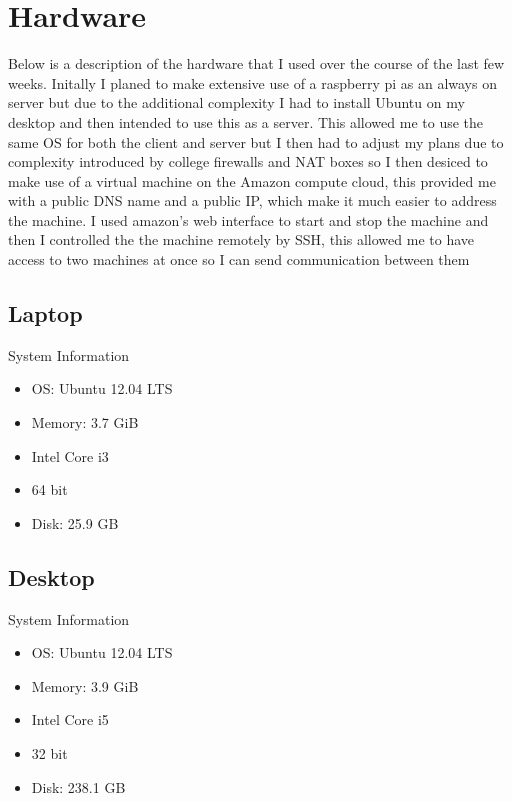 \documentclass[12pt,a4paper,oneside]{article}
\begin{document}
\section{Hardware} 
Below is a description of the hardware that I used over the course of the last few weeks. Initally I planed to make extensive use of a raspberry pi as an always on server but due to the additional complexity I had to install Ubuntu on my desktop and then intended to use this as a server. This allowed me to use the same OS for both the client and server but I then had to adjust my plans due to complexity introduced by college firewalls and NAT boxes so I then desiced to make use of a virtual machine on the Amazon compute cloud, this provided me with a public DNS name and a public IP, which make it much easier to address the machine. I used amazon's web interface to start and stop the machine and then I controlled the the machine remotely by SSH, this allowed me to have access to two machines at once so I can send communication between them

\subsection{Laptop}
System Information
\begin{itemize}
\item OS: Ubuntu 12.04 LTS
\item Memory: 3.7 GiB
\item Intel Core i3
\item 64 bit
\item Disk: 25.9 GB
\end{itemize}

\subsection{Desktop}
System Information
\begin{itemize}
\item OS: Ubuntu 12.04 LTS
\item Memory: 3.9 GiB
\item Intel Core i5
\item 32 bit
\item Disk: 238.1 GB
\end{itemize}
\end{document}
